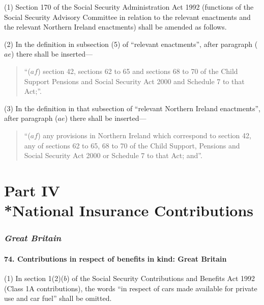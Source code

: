 \documentclass[12pt,a4paper]{article}
\begin{document}
(1) Section 170 of the Social Security Administration Act 1992 (functions of the Social Security Advisory Committee in relation to the relevant enactments and the relevant Northern Ireland enactments) shall be amended as follows.

(2) In the definition in subsection (5)  of “relevant enactments”, after paragraph ($ae$)  there shall be inserted—
\begin{quotation}
“($af$) section 42, sections 62 to 65 and sections 68 to 70 of the Child Support Pensions and Social Security Act 2000 and Schedule 7 to that Act;”.
\end{quotation}

(3) In the definition in that subsection of “relevant Northern Ireland enactments”, after paragraph ($ae$)  there shall be inserted—

\begin{quotation}
“($af$) any provisions in Northern Ireland which correspond to section 42, any of sections 62 to 65, 68 to 70 of the Child Support, Pensions and Social Security Act 2000 or Schedule 7 to that Act; and”.
\end{quotation}


\part[Part IV --- National Insurance Contributions]{Part IV\\*National Insurance Contributions}

\renewcommand\parthead{--- Part IV}

\section{\itshape Great Britain}

\subsection{74. Contributions in respect of benefits in kind: Great Britain}

(1) In section 1(2)($b$)  of the Social Security Contributions and Benefits Act 1992 (Class 1A contributions), the words “in respect of cars made available for private use and car fuel” shall be omitted.
\end{document}
